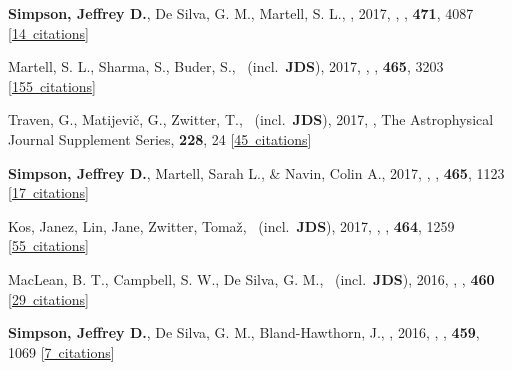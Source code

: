 \item[{\color{numcolor}\scriptsize11}] \textbf{Simpson, Jeffrey D.}, De Silva, G. M., Martell, S. L., \etal, 2017, , \mnras, \textbf{471}, 4087 [\href{https://ui.adsabs.harvard.edu/#abs/2017MNRAS.471.4087S}{14~citations}]

\item[{\color{numcolor}\scriptsize10}] Martell, S. L., Sharma, S., Buder, S., \etal\ (incl.\ \textbf{JDS}), 2017, , \mnras, \textbf{465}, 3203 [\href{https://ui.adsabs.harvard.edu/#abs/2017MNRAS.465.3203M}{155~citations}]

\item[{\color{numcolor}\scriptsize9}] Traven, G., Matijevi{\v{c}}, G., Zwitter, T., \etal\ (incl.\ \textbf{JDS}), 2017, , The Astrophysical Journal Supplement Series, \textbf{228}, 24 [\href{https://ui.adsabs.harvard.edu/#abs/2017ApJS..228...24T}{45~citations}]

\item[{\color{numcolor}\scriptsize8}] \textbf{Simpson, Jeffrey D.}, Martell, Sarah L., \& Navin, Colin A., 2017, , \mnras, \textbf{465}, 1123 [\href{https://ui.adsabs.harvard.edu/#abs/2017MNRAS.465.1123S}{17~citations}]

\item[{\color{numcolor}\scriptsize7}] Kos, Janez, Lin, Jane, Zwitter, Toma{\v{z}}, \etal\ (incl.\ \textbf{JDS}), 2017, , \mnras, \textbf{464}, 1259 [\href{https://ui.adsabs.harvard.edu/#abs/2017MNRAS.464.1259K}{55~citations}]

\item[{\color{numcolor}\scriptsize6}] MacLean, B. T., Campbell, S. W., De Silva, G. M., \etal\ (incl.\ \textbf{JDS}), 2016, , \mnras, \textbf{460} [\href{https://ui.adsabs.harvard.edu/#abs/2016MNRAS.460L..69M}{29~citations}]

\item[{\color{numcolor}\scriptsize5}] \textbf{Simpson, Jeffrey D.}, De Silva, G. M., Bland-Hawthorn, J., \etal, 2016, , \mnras, \textbf{459}, 1069 [\href{https://ui.adsabs.harvard.edu/#abs/2016MNRAS.459.1069S}{7~citations}]

